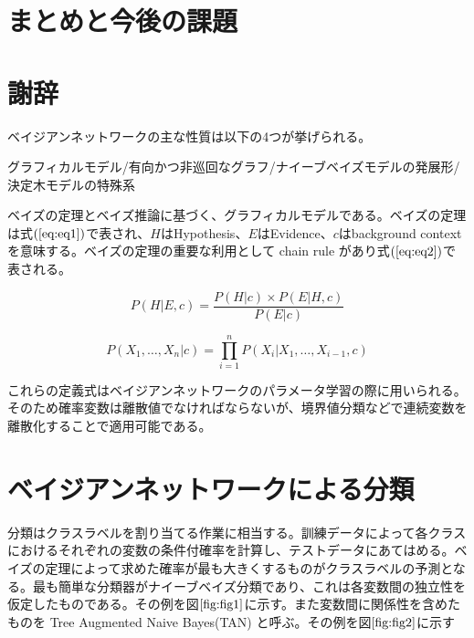 \documentclass[a4j,12pt]{jarticle}
\begin{document}
\section{まとめと今後の課題}

\section{謝辞}



ベイジアンネットワークの主な性質は以下の4つが挙げられる。

グラフィカルモデル/有向かつ非巡回なグラフ/ナイーブベイズモデルの発展形/決定木モデルの特殊系

ベイズの定理とベイズ推論に基づく、グラフィカルモデルである。ベイズの定理は式$(\ref{eq:eq1})$で表され、$H$はHypothesis、$E$はEvidence、$c$はbackground contextを意味する。ベイズの定理の重要な利用として chain rule があり式$(\ref{eq:eq2})$で表される。

\begin{equation}
\label{eq:eq1}
P(H|E,c) = \frac{P(H|c) \times P(E|H,c)}{P(E|c)}
\end{equation}

\begin{equation}
\label{eq:eq2}
P(X_1, \ldots, X_n|c) = \prod_{i=1}^n P(X_i|X_1, \ldots, X_{i-1},c)
\end{equation}

これらの定義式はベイジアンネットワークのパラメータ学習の際に用いられる。そのため確率変数は離散値でなければならないが、境界値分類などで連続変数を離散化することで適用可能である。

\section{ベイジアンネットワークによる分類}

分類はクラスラベルを割り当てる作業に相当する。訓練データによって各クラスにおけるそれぞれの変数の条件付確率を計算し、テストデータにあてはめる。ベイズの定理によって求めた確率が最も大きくするものがクラスラベルの予測となる。最も簡単な分類器がナイーブベイズ分類であり、これは各変数間の独立性を仮定したものである。その例を図$\ref{fig:fig1}$に示す。また変数間に関係性を含めたものを Tree Augmented Naive Bayes(TAN) と呼ぶ。その例を図$\ref{fig:fig2}$に示す
\end{document}
